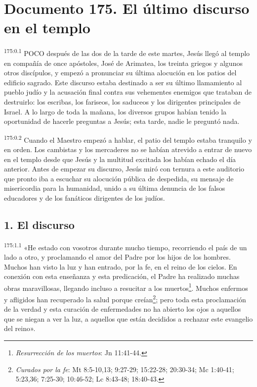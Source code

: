 \chapter{Documento 175. El último discurso en el templo}
\par
\textsuperscript{175:0.1} POCO después de las dos de la tarde de este martes, Jesús llegó al templo en compañía de once apóstoles, José de Arimatea, los treinta griegos y algunos otros discípulos, y empezó a pronunciar su última alocución en los patios del edificio sagrado. Este discurso estaba destinado a ser su último llamamiento al pueblo judío y la acusación final contra sus vehementes enemigos que trataban de destruirlo: los escribas, los fariseos, los saduceos y los dirigentes principales de Israel. A lo largo de toda la mañana, los diversos grupos habían tenido la oportunidad de hacerle preguntas a Jesús; esta tarde, nadie le preguntó nada.

\par
\textsuperscript{175:0.2} Cuando el Maestro empezó a hablar, el patio del templo estaba tranquilo y en orden. Los cambistas y los mercaderes no se habían atrevido a entrar de nuevo en el templo desde que Jesús y la multitud excitada los habían echado el día anterior. Antes de empezar su discurso, Jesús miró con ternura a este auditorio que pronto iba a escuchar su alocución pública de despedida, su mensaje de misericordia para la humanidad, unido a su última denuncia de los falsos educadores y de los fanáticos dirigentes de los judíos.

\section*{1. El discurso}
\par
\textsuperscript{175:1.1} «He estado con vosotros durante mucho tiempo, recorriendo el país de un lado a otro, y proclamando el amor del Padre por los hijos de los hombres. Muchos han visto la luz y han entrado, por la fe, en el reino de los cielos. En conexión con esta enseñanza y esta predicación, el Padre ha realizado muchas obras maravillosas, llegando incluso a resucitar a los muertos\footnote{\textit{Resurrección de los muertos}: Jn 11:41-44.}. Muchos enfermos y afligidos han recuperado la salud porque creían\footnote{\textit{Curados por la fe}: Mt 8:5-10,13; 9:27-29; 15:22-28; 20:30-34; Mc 1:40-41; 5:23,36; 7:25-30; 10:46-52; Lc 8:43-48; 18:40-43.}; pero toda esta proclamación de la verdad y esta curación de enfermedades no ha abierto los ojos a aquellos que se niegan a ver la luz, a aquellos que están decididos a rechazar este evangelio del reino».

